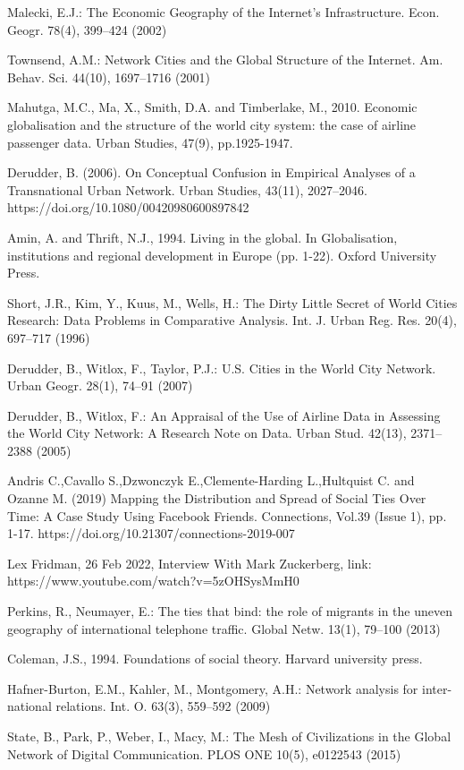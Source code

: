 \documentclass[12pt]{article}
\begin{document}
Malecki, E.J.: The Economic Geography of the Internet’s Infrastructure. Econ.
Geogr. 78(4), 399–424 (2002)

Townsend, A.M.: Network Cities and the Global Structure of the Internet. Am.
Behav. Sci. 44(10), 1697–1716 (2001)

Mahutga, M.C., Ma, X., Smith, D.A. and Timberlake, M., 2010. Economic globalisation and the structure of the world city system: the case of airline passenger data. Urban Studies, 47(9), pp.1925-1947.

Derudder, B. (2006). On Conceptual Confusion in Empirical Analyses of a Transnational Urban Network. Urban Studies, 43(11), 2027–2046. https://doi.org/10.1080/00420980600897842

Amin, A. and Thrift, N.J., 1994. Living in the global. In Globalisation, institutions and regional development in Europe (pp. 1-22). Oxford University Press.

Short, J.R., Kim, Y., Kuus, M., Wells, H.: The Dirty Little Secret of World Cities
Research: Data Problems in Comparative Analysis. Int. J. Urban Reg. Res. 20(4),
697–717 (1996)

Derudder, B., Witlox, F., Taylor, P.J.: U.S. Cities in the World City Network.
Urban Geogr. 28(1), 74–91 (2007)

Derudder, B., Witlox, F.: An Appraisal of the Use of Airline Data in Assessing the
World City Network: A Research Note on Data. Urban Stud. 42(13), 2371–2388
(2005)

Andris C.,Cavallo S.,Dzwonczyk E.,Clemente-Harding L.,Hultquist C. and Ozanne M. (2019) Mapping the Distribution and Spread of Social Ties Over Time: A Case Study Using Facebook Friends. Connections, Vol.39 (Issue 1), pp. 1-17. https://doi.org/10.21307/connections-2019-007

Lex Fridman, 26 Feb 2022, Interview With Mark Zuckerberg, link: https://www.youtube.com/watch?v=5zOHSysMmH0

Perkins, R., Neumayer, E.: The ties that bind: the role of migrants in the uneven
geography of international telephone traffic. Global Netw. 13(1), 79–100 (2013)

Coleman, J.S., 1994. Foundations of social theory. Harvard university press.

Hafner-Burton, E.M., Kahler, M., Montgomery, A.H.: Network analysis for inter-
national relations. Int. O. 63(3), 559–592 (2009)

State, B., Park, P., Weber, I., Macy, M.: The Mesh of Civilizations in the Global
Network of Digital Communication. PLOS ONE 10(5), e0122543 (2015)
\end{document}
